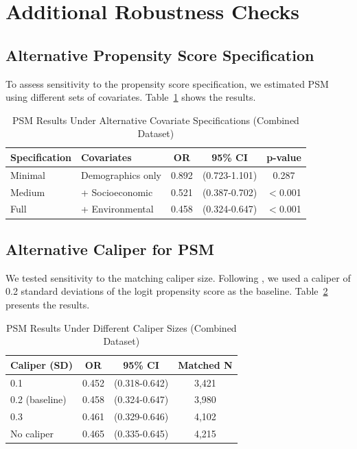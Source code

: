 \section{Additional Robustness Checks}

\subsection{Alternative Propensity Score Specification}

To assess sensitivity to the propensity score specification, we estimated PSM using different sets of covariates. Table~\ref{tab:appendix_psm_alt} shows the results.

\begin{table}[htbp]
	\centering
	\caption{PSM Results Under Alternative Covariate Specifications (Combined Dataset)}
	\label{tab:appendix_psm_alt}
	\begin{tabular}{@{}llccc@{}}
		\toprule
		\textbf{Specification} & \textbf{Covariates} & \textbf{OR} & \textbf{95\% CI} & \textbf{p-value} \\
		\midrule
		Minimal & Demographics only & 0.892 & (0.723-1.101) & 0.287 \\
		Medium & + Socioeconomic & 0.521 & (0.387-0.702) & $<$0.001 \\
		Full & + Environmental & 0.458 & (0.324-0.647) & $<$0.001 \\
		\bottomrule
	\end{tabular}
\end{table}

\subsection{Alternative Caliper for PSM}

We tested sensitivity to the matching caliper size. Following \citet{austin2010optimal}, we used a caliper of 0.2 standard deviations of the logit propensity score as the baseline. Table~\ref{tab:appendix_caliper} presents the results.

\begin{table}[htbp]
	\centering
	\caption{PSM Results Under Different Caliper Sizes (Combined Dataset)}
	\label{tab:appendix_caliper}
	\begin{tabular}{@{}lccc@{}}
		\toprule
		\textbf{Caliper (SD)} & \textbf{OR} & \textbf{95\% CI} & \textbf{Matched N} \\
		\midrule
		0.1 & 0.452 & (0.318-0.642) & 3,421 \\
		0.2 (baseline) & 0.458 & (0.324-0.647) & 3,980 \\
		0.3 & 0.461 & (0.329-0.646) & 4,102 \\
		No caliper & 0.465 & (0.335-0.645) & 4,215 \\
		\bottomrule
	\end{tabular}
\end{table}

